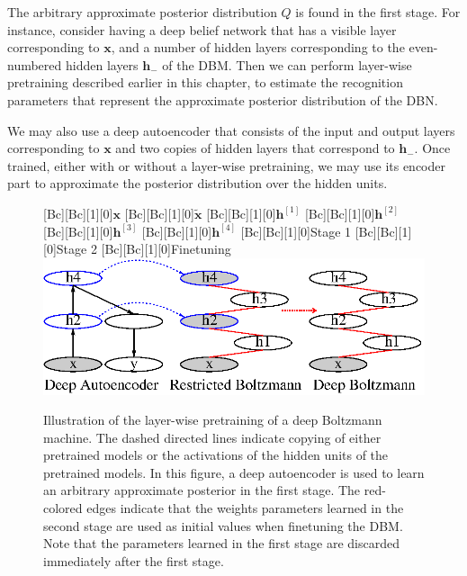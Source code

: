 \documentclass{now}
\newcommand{\qlay}[1]{\left[#1\right]}
\newcommand{\vect}[1]{\mathbf{#1}}
\newcommand{\vh}[0]{\vect{h}}
\newcommand{\vx}[0]{\vect{x}}
\begin{document}
The arbitrary approximate posterior distribution $Q$ is found in the first
stage. For instance, consider having a deep belief network that has a visible
layer corresponding to $\vx$, and a number of hidden layers corresponding to the
even-numbered hidden layers $\vh_-$ of the DBM. Then we can perform layer-wise
pretraining described earlier in this chapter, to estimate the recognition
parameters that represent the approximate posterior distribution of the DBN. 

We may also use a deep autoencoder that consists of the input and output layers
corresponding to $\vx$ and two copies of hidden layers that correspond to
$\vh_-$. Once trained, either with or without a layer-wise pretraining, we may
use its encoder part to approximate the posterior distribution over the hidden
units.

\begin{figure}[t]
    \centering
    [Bc][Bc][1][0]{$\vx$}
    [Bc][Bc][1][0]{$\tilde{\vx}$}
    [Bc][Bc][1][0]{$\vh^{\qlay{1}}$}
    [Bc][Bc][1][0]{$\vh^{\qlay{2}}$}
    [Bc][Bc][1][0]{$\vh^{\qlay{3}}$}
    [Bc][Bc][1][0]{$\vh^{\qlay{4}}$}
    [Bc][Bc][1][0]{Stage 1}
    [Bc][Bc][1][0]{Stage 2}
    [Bc][Bc][1][0]{Finetuning}
    \includegraphics[width=0.85\columnwidth]{../figures/pretrain_dbm2.eps}
    \caption{Illustration of the layer-wise pretraining of a deep Boltzmann
        machine. The dashed directed lines indicate copying of either
        pretrained models or the activations of the hidden units of the
        pretrained models. In this figure, a deep autoencoder is used to learn
        an arbitrary approximate posterior in the first stage. The red-colored
        edges indicate that the weights parameters learned in the second stage
        are used as initial values when finetuning the DBM. Note that the
    parameters learned in the first stage are discarded immediately after the
first stage.}
    \label{fig:two_stage_pretraining}
\end{figure}
\end{document}
